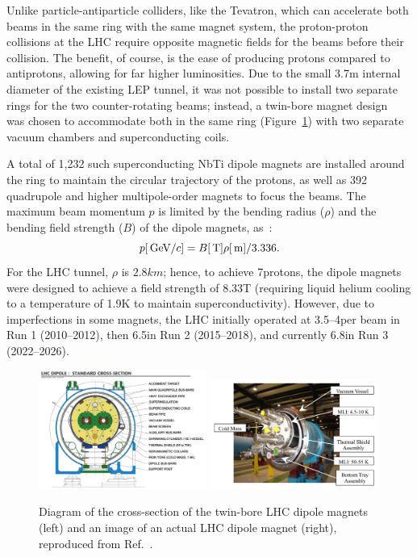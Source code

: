 Unlike particle-antiparticle colliders, like the Tevatron, which can accelerate both beams in the same ring with the same magnet system, the proton-proton collisions at the LHC require opposite magnetic fields for the beams before their collision.
The benefit, of course, is the ease of producing protons compared to antiprotons, allowing for far higher luminosities.
Due to the small 3.7\unit{m} internal diameter of the existing LEP tunnel, it was not possible to install two separate rings for the two counter-rotating beams; instead, a twin-bore magnet design~\cite{Blewett:1971zzb} was chosen to accommodate both in the same ring (Figure~\ref{fig:02_lhc_twinbore}) with two separate vacuum chambers and superconducting coils.

A total of 1,232 such superconducting NbTi dipole magnets are installed around the ring to maintain the circular trajectory of the protons, as well as 392 quadrupole and higher multipole-order magnets to focus the beams.
The maximum beam momentum $p$ is limited by the bending radius ($\rho$) and the bending field strength ($B$) of the dipole magnets, as~\cite{Bruning:2012zz}:
\begin{equation}
    p [\,\text{Ge\hspace{-.08em}V} / c] = B [\text{\,T}] \rho [\text{\,m}] / 3.336.
\end{equation}
For the LHC tunnel, $\rho$ is $2.8\unit{km}$; hence, to achieve 7\TeV protons, the dipole magnets were designed to achieve a field strength of 8.33\unit{T} (requiring liquid helium cooling to a temperature of 1.9\unit{K} to maintain superconductivity).
However, due to imperfections in some magnets, the LHC initially operated at 3.5--4\TeV per beam in Run 1 (2010--2012), then 6.5\TeV in Run 2 (2015--2018), and currently 6.8\TeV in Run 3 (2022--2026).

\begin{figure}[ht]
    \centering
    \includegraphics[width=0.49\textwidth]{figures/02-CMS/lhc/dipole_crossection.png}
    \includegraphics[width=0.49\textwidth]{figures/02-CMS/lhc/magnet.png}
    \caption{Diagram of the cross-section of the twin-bore LHC dipole magnets (left) and an image of an actual LHC dipole magnet (right), reproduced from Ref.~\cite{Evans:2008zzb}.}
    \label{fig:02_lhc_twinbore}
\end{figure}

